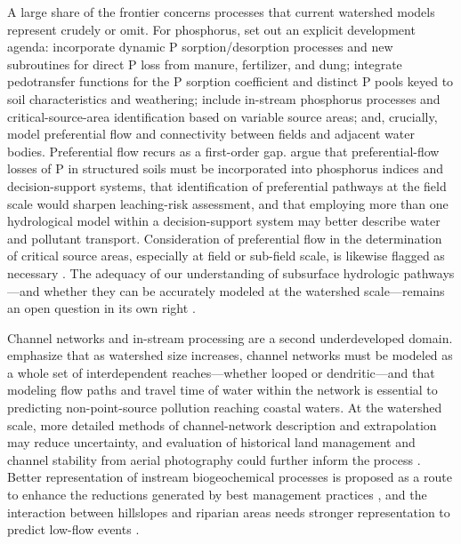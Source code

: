 A large share of the frontier concerns processes that current watershed models represent crudely or omit. For phosphorus, \textcite{Wang2020b} set out an explicit development agenda: incorporate dynamic P sorption/desorption processes and new subroutines for direct P loss from manure, fertilizer, and dung; integrate pedotransfer functions for the P sorption coefficient and distinct P pools keyed to soil characteristics and weathering; include in-stream phosphorus processes and critical-source-area identification based on variable source areas; and, crucially, model preferential flow and connectivity between fields and adjacent water bodies. Preferential flow recurs as a first-order gap. \textcite{Djodjic2002} argue that preferential-flow losses of P in structured soils must be incorporated into phosphorus indices and decision-support systems, that identification of preferential pathways at the field scale would sharpen leaching-risk assessment, and that employing more than one hydrological model within a decision-support system may better describe water and pollutant transport. Consideration of preferential flow in the determination of critical source areas, especially at field or sub-field scale, is likewise flagged as necessary \parencite{Wang2020b}. The adequacy of our understanding of subsurface hydrologic pathways---and whether they can be accurately modeled at the watershed scale---remains an open question in its own right \parencite{Sims1998}.

Channel networks and in-stream processing are a second underdeveloped domain. \textcite{Giraud1997} emphasize that as watershed size increases, channel networks must be modeled as a whole set of interdependent reaches---whether looped or dendritic---and that modeling flow paths and travel time of water within the network is essential to predicting non-point-source pollution reaching coastal waters. At the watershed scale, more detailed methods of channel-network description and extrapolation may reduce uncertainty, and evaluation of historical land management and channel stability from aerial photography could further inform the process \parencite{Williamson2025}. Better representation of instream biogeochemical processes is proposed as a route to enhance the reductions generated by best management practices \parencite{Schilling2012b}, and the interaction between hillslopes and riparian areas needs stronger representation to predict low-flow events \parencite{Basu2010}.

